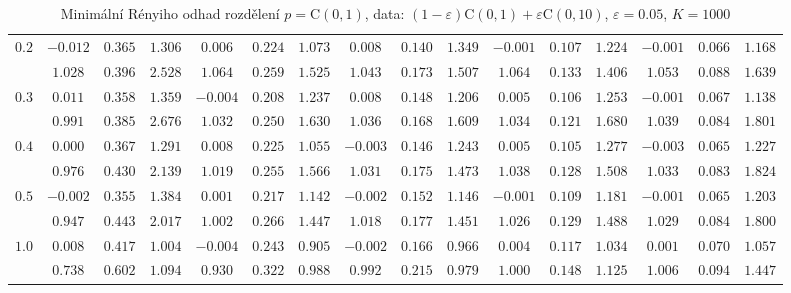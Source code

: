 \begin{table}[htb]
\begin{center}
\begin{tabular}{|c|ccc|ccc|ccc|ccc|ccc|}
\hline 
$0.2$ & $ -0.012 $ & $ 0.365 $ & $ 1.306 $ & $ 0.006 $ & $ 0.224 $ & $ 1.073 $ & $ 0.008 $ & $ 0.140 $ & $ 1.349 $ & $ -0.001 $ & $ 0.107 $ & $ 1.224 $ & $ -0.001 $ & $ 0.066 $ & $ 1.168 $\\ 
 & $ 1.028 $ & $ 0.396 $ & $ 2.528 $ & $ 1.064 $ & $ 0.259 $ & $ 1.525 $ & $ 1.043 $ & $ 0.173 $ & $ 1.507 $ & $ 1.064 $ & $ 0.133 $ & $ 1.406 $ & $ 1.053 $ & $ 0.088 $ & $ 1.639 $\\ 
\hline 
$0.3$ & $ 0.011 $ & $ 0.358 $ & $ 1.359 $ & $ -0.004 $ & $ 0.208 $ & $ 1.237 $ & $ 0.008 $ & $ 0.148 $ & $ 1.206 $ & $ 0.005 $ & $ 0.106 $ & $ 1.253 $ & $ -0.001 $ & $ 0.067 $ & $ 1.138 $\\ 
 & $ 0.991 $ & $ 0.385 $ & $ 2.676 $ & $ 1.032 $ & $ 0.250 $ & $ 1.630 $ & $ 1.036 $ & $ 0.168 $ & $ 1.609 $ & $ 1.034 $ & $ 0.121 $ & $ 1.680 $ & $ 1.039 $ & $ 0.084 $ & $ 1.801 $\\ 
\hline 
$0.4$ & $ 0.000 $ & $ 0.367 $ & $ 1.291 $ & $ 0.008 $ & $ 0.225 $ & $ 1.055 $ & $ -0.003 $ & $ 0.146 $ & $ 1.243 $ & $ 0.005 $ & $ 0.105 $ & $ 1.277 $ & $ -0.003 $ & $ 0.065 $ & $ 1.227 $\\ 
 & $ 0.976 $ & $ 0.430 $ & $ 2.139 $ & $ 1.019 $ & $ 0.255 $ & $ 1.566 $ & $ 1.031 $ & $ 0.175 $ & $ 1.473 $ & $ 1.038 $ & $ 0.128 $ & $ 1.508 $ & $ 1.033 $ & $ 0.083 $ & $ 1.824 $\\ 
\hline 
$0.5$ & $ -0.002 $ & $ 0.355 $ & $ 1.384 $ & $ 0.001 $ & $ 0.217 $ & $ 1.142 $ & $ -0.002 $ & $ 0.152 $ & $ 1.146 $ & $ -0.001 $ & $ 0.109 $ & $ 1.181 $ & $ -0.001 $ & $ 0.065 $ & $ 1.203 $\\ 
 & $ 0.947 $ & $ 0.443 $ & $ 2.017 $ & $ 1.002 $ & $ 0.266 $ & $ 1.447 $ & $ 1.018 $ & $ 0.177 $ & $ 1.451 $ & $ 1.026 $ & $ 0.129 $ & $ 1.488 $ & $ 1.029 $ & $ 0.084 $ & $ 1.800 $\\ 
\hline 
$1.0$ & $ 0.008 $ & $ 0.417 $ & $ 1.004 $ & $ -0.004 $ & $ 0.243 $ & $ 0.905 $ & $ -0.002 $ & $ 0.166 $ & $ 0.966 $ & $ 0.004 $ & $ 0.117 $ & $ 1.034 $ & $ 0.001 $ & $ 0.070 $ & $ 1.057 $\\ 
 & $ 0.738 $ & $ 0.602 $ & $ 1.094 $ & $ 0.930 $ & $ 0.322 $ & $ 0.988 $ & $ 0.992 $ & $ 0.215 $ & $ 0.979 $ & $ 1.000 $ & $ 0.148 $ & $ 1.125 $ & $ 1.006 $ & $ 0.094 $ & $ 1.447 $\\ 
\hline 
\end{tabular}
\caption{Minimální Rényiho odhad rozdělení  $p = \mathrm{C}(0,1)$, data: $(1-\varepsilon)\mathrm{C}(0,1) + \varepsilon \mathrm{C}(0,10)$, $\varepsilon =  0.05$, $K = 1000$} 
\end{center}
\end{table}

